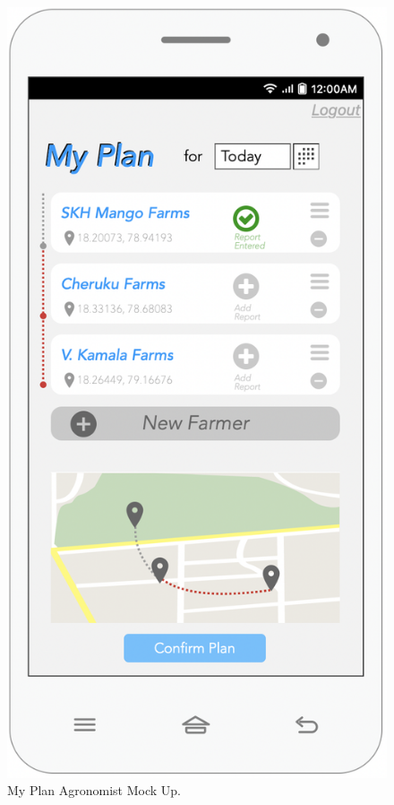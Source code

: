 \begin{multicols}{3}
\begin{figure}[H]
\centering
\includegraphics[scale=0.35]{../images_diagrams/mock_ups/myplan100.png}
\caption{\label{fig:mock_plan}My Plan Agronomist Mock Up.}
\end{figure}



\end{multicols}
